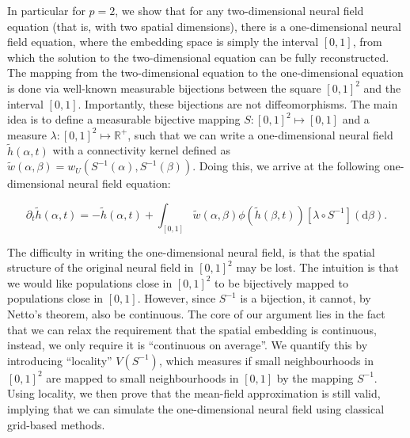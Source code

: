 \documentclass[10pt,letterpaper]{article}
\def\d{\mathrm d}
\begin{document}

In particular for $p=2$, we show that for any two-dimensional neural field equation (that is, with two spatial dimensions), there is a one-dimensional neural field equation, where the embedding space is simply the interval $[0,1]$, from which the solution to the two-dimensional equation can be fully reconstructed. The mapping from the two-dimensional equation to the one-dimensional equation is done via well-known measurable bijections between the square $[0,1]^2$ and the interval $[0,1]$. Importantly, these bijections are not diffeomorphisms.
The main idea is to define a measurable bijective mapping $S : [0,1]^2 \mapsto [0,1]$ and a measure $\lambda : [0,1]^2 \mapsto \mathbb{R}^+$, such that we can write a one-dimensional neural field	$\tilde h(\alpha, t)$ with a connectivity kernel defined as $\tilde w(\alpha, \beta) = w_U(S^{-1}(\alpha), S^{-1}(\beta))$. Doing this, we arrive at the following one-dimensional neural field equation: 

\begin{equation} \label{eq:nf-in-01}
\partial_t \tilde h(\alpha, t) = -\tilde h(\alpha, t) + \int_{[0,1]} \tilde w(\alpha, \beta) \phi(\tilde h(\beta, t)) \left[\lambda \circ S^{-1}\right](\d \beta).
\end{equation}

The difficulty in writing the one-dimensional neural field, is that the spatial structure of the original neural field in $[0,1]^2$ may be lost. The intuition is that we would like populations close in $[0,1]^2$ to be bijectively mapped to populations close in $[0,1]$. However, since $S^{-1}$ is a bijection, it cannot, by Netto's theorem, also be continuous. The core of our argument lies in the fact that we can relax the requirement that the spatial embedding is continuous, instead, we only require it is ``continuous on average''. We quantify this by introducing ``locality'' $V(S^{-1})$, which measures if small neighbourhoods in $[0,1]^2$ are mapped to small neighbourhoods in $[0,1]$ by the mapping $S^{-1}$. Using locality, we then prove that the mean-field approximation is still valid, implying that we can simulate the one-dimensional neural field using classical grid-based methods.
\end{document}

